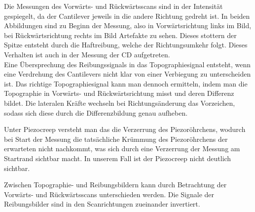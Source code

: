 Die Messungen des Vorwärts- und Rückwärtsscans sind in der Intensität gespiegelt, da der Cantilever jeweils in die andere Richtung gedreht ist. In beiden Abbildungen sind zu Beginn der Messung, also in Vorwärtsrichtung links im Bild, bei Rückwärtsrichtung rechts im Bild Artefakte zu sehen. Dieses stottern der Spitze entsteht durch die Haftreibung, welche der Richtungsumkehr folgt. Dieses Verhalten ist auch in der Messung der CD aufgetreten. \\
Eine Übersprechung des Reibungssignals in das Topographiesignal entsteht, wenn eine Verdrehung des Cantilevers nicht klar von einer Verbiegung zu unterscheiden ist. Das richtige Topographiesignal kann man dennoch ermitteln, indem man die Topographie in Vorwärts- und Rückwärtsrichtung misst und deren Differenz bildet. Die lateralen Kräfte wechseln bei Richtungsänderung das Vorzeichen, sodass sich diese durch die Differenzbildung genau aufheben. 

Unter Piezocreep versteht man das die Verzerrung des Piezoröhrchens, wodurch bei Start der Messung die tatsächliche Krümmung des Piezoröhrchens der erwarteten nicht nachkommt, was sich durch eine Verzerrung der Messung am Startrand sichtbar macht. In unserem Fall ist der Piezocreep nicht deutlich sichtbar. 

Zwischen Topographie- und Reibungsbildern kann durch Betrachtung der Vorwärts- und Rückwärtsscans unterschieden werden. Die Signale der Reibungsbilder sind in den Scanrichtungen zueinander invertiert.